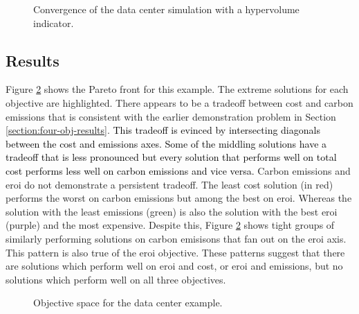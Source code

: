\begin{figure}[htbp!]
    \centering
    \resizebox{0.75\columnwidth}{!}{}
    \caption{Convergence of the data center simulation with a hypervolume indicator.}
    \label{fig:convergence}
\end{figure}

\subsection{Results}

Figure \ref{fig:dc_objective_space} shows the Pareto front for this example. The
extreme solutions for each objective are highlighted. There appears to be a
tradeoff between cost and carbon emissions that is consistent with the earlier
demonstration problem in Section \ref{section:four-obj-results}.
\textcolor{black}{This tradeoff is evinced by intersecting diagonals between the
cost and emissions axes. Some of the middling solutions have a tradeoff that is
less pronounced but every solution that performs well on total cost performs
less well on carbon emissions and vice versa.} Carbon emissions and \ac{eroi} do
not demonstrate a persistent tradeoff. The least cost solution (in red) performs
the worst on carbon emissions but among the best on \ac{eroi}. Whereas the
solution with the least emissions (green) is also the solution with the best
\ac{eroi} (purple) and the most expensive. Despite this, Figure
\ref{fig:dc_objective_space} shows tight groups of similarly performing
solutions on carbon emisisons that fan out on the \ac{eroi} axis. This pattern
is also true of the \ac{eroi} objective. These patterns suggest that there are
solutions which perform well on \ac{eroi} and cost, or \ac{eroi} and emissions,
but no solutions which perform well on all three objectives.

\begin{figure}[htbp!]
    \centering
    \resizebox{\columnwidth}{!}{}
    \caption{Objective space for the data center example.}
    \label{fig:dc_objective_space}
\end{figure}


